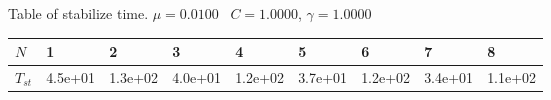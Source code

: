 \begin{center}
Table of stabilize time. $\mu = 0.0100$ \, $C = 1.0000$, $\gamma = 1.0000$
  
\begin{tabular}{|p{0.6in}|p{0.6in}|p{0.6in}|p{0.6in}|p{0.6in}|p{0.6in}|p{0.6in}|p{0.6in}|p{0.6in}|} \hline
$N$ &1 &2 &3 &4 &5 &6 &7 &8 \\ \hline 
$T_{st}$ &4.5e+01 &1.3e+02 &4.0e+01 &1.2e+02 &3.7e+01 &1.2e+02 &3.4e+01 &1.1e+02 \\ \hline 

\end{tabular}\\[20pt]
\end{center}
